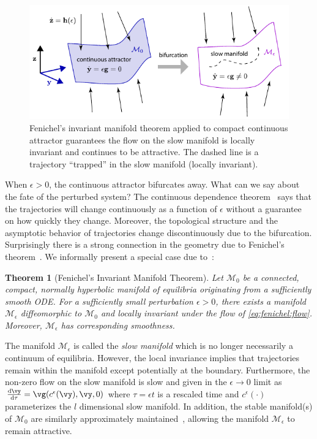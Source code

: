 \documentclass{article} %
\newcounter{ct}
\newcommand{\dm}[1]{\ensuremath{\mathrm{d}{#1}}} %
\newcommand{\RN}[2]{\frac{\dm{#1}}{\dm{#2}}} %
\newcommand{\manifold}{\mathcal{M}}
\newtheorem{theorem}{Theorem}
\theoremstyle{definition}
\theoremstyle{remark}
\renewcommand{\cite}{\citep}
\begin{document}
\begin{figure}[bthp]
  \centering
  \includegraphics{FenichelThm.pdf}
  \caption{
    Fenichel's invariant manifold theorem applied to compact continuous attractor guarantees the flow on the slow manifold is locally invariant and continues to be attractive.
    The dashed line is a trajectory ``trapped'' in the slow manifold (locally invariant).
  }
  \label{fig:fenichel}
\end{figure}

When $\epsilon > 0$, the continuous attractor bifurcates away.
What can we say about the fate of the perturbed system?
The continuous dependence theorem~\citep{Chicone2006} says that the trajectories will change continuously as a function of $\epsilon$ without a guarantee on how quickly they change.
Moreover, the topological structure and the asymptotic behavior of trajectories change discontinuously due to the bifurcation.
Surprisingly there is a strong connection in the geometry due to Fenichel's theorem~\cite{fenichel1971}.
We informally present a special case due to~\cite{Jones1995}:
\begin{theorem}[Fenichel's Invariant Manifold Theorem]
Let $\manifold_0$ be a connected, compact, normally hyperbolic manifold of equilibria originating from a sufficiently smooth ODE.
For a sufficiently small perturbation $\epsilon > 0$, there exists a manifold $\manifold_\epsilon$ diffeomorphic to $\manifold_0$ and locally invariant under the flow of \eqref{eq:fenichel:flow}.
Moreover, $\manifold_\epsilon$ has corresponding smoothness.
\end{theorem}

The manifold $\manifold_\epsilon$ is called the \emph{slow manifold} which is no longer necessarily a continuum of equilibria.
However, the local invariance implies that trajectories remain within the manifold except potentially at the boundary.
Furthermore, the non-zero flow on the slow manifold is slow and given in the $\epsilon \to 0$ limit as $\RN{\vy}{\tau} = \vg(c^\epsilon(\vy), \vy, 0)$ where $\tau = \epsilon t$ is a rescaled time and $c^\epsilon(\cdot)$ parameterizes the $l$ dimensional slow manifold.
In addition, the stable manifold(s) of $\manifold_0$ are similarly approximately maintained~\cite{Jones1995}, allowing the manifold $\manifold_\epsilon$ to remain attractive.
\end{document}
